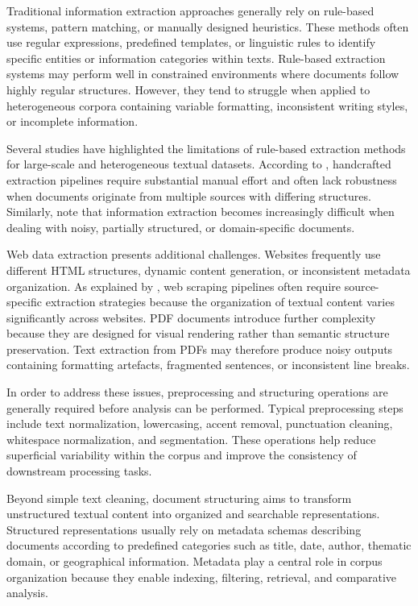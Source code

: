 \documentclass[
11pt,
english,
singlespacing,
headsepline,
]{MastersDoctoralThesis}
\begin{document}
Traditional information extraction approaches generally rely on rule-based systems, pattern matching, or manually designed heuristics. These methods often use regular expressions, predefined templates, or linguistic rules to identify specific entities or information categories within texts. Rule-based extraction systems may perform well in constrained environments where documents follow highly regular structures. However, they tend to struggle when applied to heterogeneous corpora containing variable formatting, inconsistent writing styles, or incomplete information.

Several studies have highlighted the limitations of rule-based extraction methods for large-scale and heterogeneous textual datasets. According to \citet{grishman2019information}, handcrafted extraction pipelines require substantial manual effort and often lack robustness when documents originate from multiple sources with differing structures. Similarly, \citet{sarawagi2008information} note that information extraction becomes increasingly difficult when dealing with noisy, partially structured, or domain-specific documents.

Web data extraction presents additional challenges. Websites frequently use different HTML structures, dynamic content generation, or inconsistent metadata organization. As explained by \citet{mitchell2018web}, web scraping pipelines often require source-specific extraction strategies because the organization of textual content varies significantly across websites. PDF documents introduce further complexity because they are designed for visual rendering rather than semantic structure preservation. Text extraction from PDFs may therefore produce noisy outputs containing formatting artefacts, fragmented sentences, or inconsistent line breaks.

In order to address these issues, preprocessing and structuring operations are generally required before analysis can be performed. Typical preprocessing steps include text normalization, lowercasing, accent removal, punctuation cleaning, whitespace normalization, and segmentation. These operations help reduce superficial variability within the corpus and improve the consistency of downstream processing tasks.

Beyond simple text cleaning, document structuring aims to transform unstructured textual content into organized and searchable representations. Structured representations usually rely on metadata schemas describing documents according to predefined categories such as title, date, author, thematic domain, or geographical information. Metadata play a central role in corpus organization because they enable indexing, filtering, retrieval, and comparative analysis.
\end{document}
